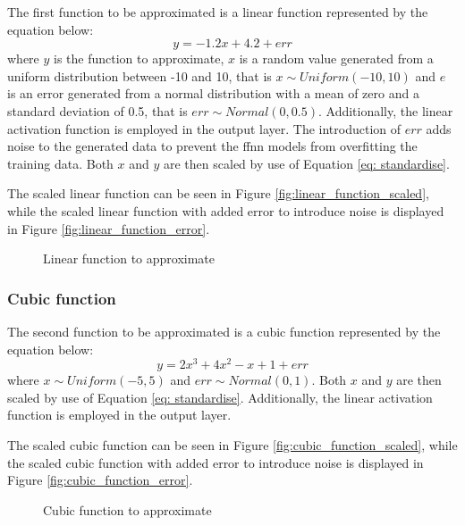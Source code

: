 \documentclass[10pt, conference]{IEEEtran}
\begin{document}
The first function to be approximated is a linear function represented by the equation below:
\begin{equation}
    y = -1.2x + 4.2 + err \label{eq: first_approximation}
\end{equation}
where $y$ is the function to approximate, $x$ is a random value generated from a uniform distribution
between -10 and 10, that is $x \sim Uniform(-10,10)$ and $e$ is an error generated from a normal
distribution with a mean of zero and a standard deviation of 0.5, that is $err \sim Normal(0,0.5)$.
Additionally, the linear activation function is employed in the output layer.
The introduction of $err$ adds noise to the generated data to prevent the \acrshort{ffnn} models
from overfitting the training data. Both $x$ and $y$ are then scaled by use of Equation \ref{eq: standardise}.

The scaled linear function can be seen in Figure \ref{fig:linear_function_scaled}, while the scaled linear
function with added error to introduce noise is displayed in Figure \ref{fig:linear_function_error}.
\begin{figure}[H]
    \centering
    \hfil
    \caption{Linear function to approximate}
    \label{fig:linear_function}
\end{figure}

\subsubsection{Cubic function}

The second function to be approximated is a cubic function represented by the equation below:
\begin{equation}
    y = 2x^3 + 4x^2 - x + 1 + err \label{eq: second_approximation}
\end{equation}
where $x \sim Uniform(-5,5)$ and $err \sim Normal(0,1)$. Both $x$ and $y$ are then scaled by use
of Equation \ref{eq: standardise}. Additionally, the linear activation function is employed in
the output layer.

The scaled cubic function can be seen in Figure \ref{fig:cubic_function_scaled}, while the scaled cubic
function with added error to introduce noise is displayed in Figure \ref{fig:cubic_function_error}.
\begin{figure}[H]
    \centering
    \hfil
    \caption{Cubic function to approximate}
    \label{fig:cubic_function}
\end{figure}
\end{document}
